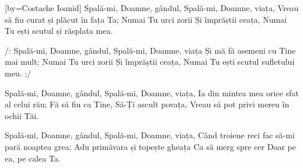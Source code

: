 [by={Costache Ioanid}]
\beginverse
Spală-mi, Doamne, gândul,
Spală-mi, Doamne, viața,
Vreau să fiu curat și plăcut în fața Ta;
Numai Tu urci zorii
Și împrăștii ceața,
Numai Tu ești scutul și răsplata mea.
\endverse

\beginchorus
/: Spală-mi, Doamne, gândul,
Spală-mi, Doamne, viața
Și mă fă asemeni cu Tine mai mult;
Numai Tu urci zorii
Și împrăștii ceața,
Numai Tu ești scutul sufletului meu. :/
\endchorus

\beginverse
Spală-mi, Doamne, gândul,
Spală-mi, Doamne, viața,
Ia din mintea mea orice sfat al celui rău;
Fă să fiu ca Tine,
Să-Ți ascult povața,
Vreau să pot privi mereu în ochii Tăi.
\endverse

\beginverse
Spală-mi, Doamne, gândul,
Spală-mi, Doamne, viața,
Când troiene reci fac să-mi pară noaptea grea;
Adu primăvara și topește gheața
Ca să merg spre cer
Doar pe ea, pe calea Ta.
\endverse
\endsong
